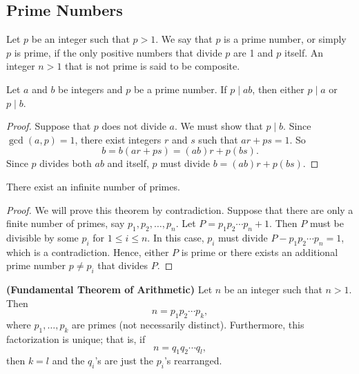 
\subsection*{Prime Numbers}

Let $p$ be an integer such that $p > 1$.  We say that $p$ is a {\bfi prime number}, or simply $p$ is {\bfi prime}, if the only positive numbers that divide $p$ are 1 and $p$ itself.  An integer $n > 1$ that is not prime is said to be {\bfi composite}.  

\begin{lemma}[Euclid]\label{integers:prime_divisor_theorem}
Let $a$ and $b$ be integers and $p$ be a prime number.  If $p \mid ab$, then either $p \mid a$ or $p \mid b$. 
\end{lemma}

\begin{proof}
Suppose that $p$ does not divide $a$.  We must show that $p \mid b$. Since $\gcd( a, p ) = 1$, there exist integers $r$ and $s$ such that $ar + ps = 1$.  So 
\[
b = b(ar + ps) = (ab)r + p(bs).
\]
Since $p$ divides both $ab$ and itself, $p$ must divide $b = (ab)r + p(bs)$. 
\end{proof}

\begin{theorem}[Euclid]\label{integers_inifinite_primes}
There exist an infinite number of primes.
\end{theorem}

\begin{proof}
We will prove this theorem by contradiction.  Suppose that there are only a finite number of primes, say $p_1, p_2, \ldots, p_n$.  Let $P = p_1  p_2  \cdots  p_n + 1$.    Then $P$ must be divisible by some $p_i$ for $1 \leq i \leq n$. In this  case, $p_i$ must divide $P - p_1 p_2 \cdots p_n = 1$, which is a contradiction.  Hence, either $P$ is prime or there exists an additional prime number $p \neq p_i$ that divides $P$.
\end{proof}

\begin{theorem} {\bf (Fundamental Theorem of Arithmetic)} \label{integers_theorem_FTA}
Let $n$ be an integer such that $n > 1$.  Then
\[
n = p_1 p_2 \cdots p_k,
\]
where $p_1, \ldots, p_k$ are  primes (not necessarily distinct).  Furthermore, this factorization is unique; that is, if 
\[
n = q_1 q_2 \cdots q_l,
\]
then $k = l$ and the $q_i$'s are just the $p_i$'s rearranged.
\end{theorem}

